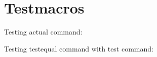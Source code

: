 \section*{Testmacros}
\makeatletter
\indent Testing actual command: \\

Testing testequal command with test command:\\
\noindent{}
\noindent{}
\noindent{}
\noindent{}
\makeatother